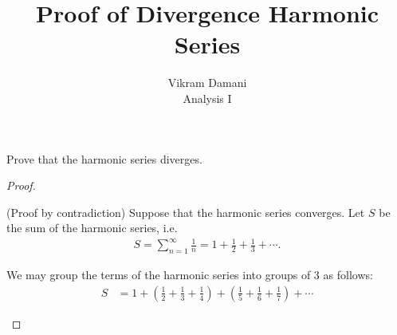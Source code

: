 \documentclass[12pt]{article}
\newenvironment{question}[2][Question]{\begin{trivlist}
        \item[\hskip \labelsep {\bfseries #1}\hskip \labelsep {\bfseries #2.}]}{\end{trivlist}}
\begin{document}
\title{Proof of Divergence Harmonic Series}
\author{Vikram Damani\\
        Analysis I}

\maketitle

\begin{question}{[Divergence of Harmonic Series]}
        Prove that the harmonic series diverges.
        \begin{proof}
                \begin{spreadlines}{0.8em}
                        (Proof by contradiction) Suppose that the harmonic series converges. Let $S$ be the sum of the harmonic series, i.e.
                        \begin{align*}
                                S=\sum_{n=1}^{\infty}\frac{1}{n}=1+\frac{1}{2}+\frac{1}{3}+\cdots.
                        \end{align*}

                        We may group the terms of the harmonic series into groups of 3 as follows:
                        \begin{align*}
                                S & =1+(\frac{1}{2}+\frac{1}{3}+\frac{1}{4})+(\frac{1}{5}+\frac{1}{6}+\frac{1}{7})+\cdots
                        \end{align*}


\end{spreadlines}
\end{proof}
\end{question}
\end{document}
